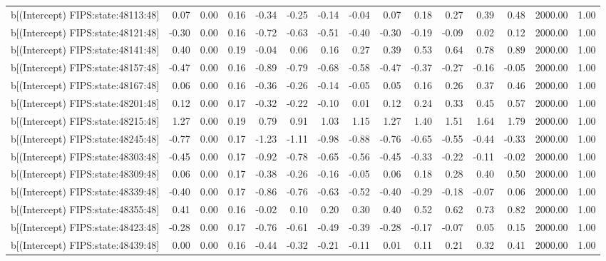 \begin{table}[ht]
\begin{tabular}{rrrrrrrrrrrrrrr}
  b[(Intercept) FIPS:state:48113:48] & 0.07 & 0.00 & 0.16 & -0.34 & -0.25 & -0.14 & -0.04 & 0.07 & 0.18 & 0.27 & 0.39 & 0.48 & 2000.00 & 1.00 \\ 
  b[(Intercept) FIPS:state:48121:48] & -0.30 & 0.00 & 0.16 & -0.72 & -0.63 & -0.51 & -0.40 & -0.30 & -0.19 & -0.09 & 0.02 & 0.12 & 2000.00 & 1.00 \\ 
  b[(Intercept) FIPS:state:48141:48] & 0.40 & 0.00 & 0.19 & -0.04 & 0.06 & 0.16 & 0.27 & 0.39 & 0.53 & 0.64 & 0.78 & 0.89 & 2000.00 & 1.00 \\ 
  b[(Intercept) FIPS:state:48157:48] & -0.47 & 0.00 & 0.16 & -0.89 & -0.79 & -0.68 & -0.58 & -0.47 & -0.37 & -0.27 & -0.16 & -0.05 & 2000.00 & 1.00 \\ 
  b[(Intercept) FIPS:state:48167:48] & 0.06 & 0.00 & 0.16 & -0.36 & -0.26 & -0.14 & -0.05 & 0.05 & 0.16 & 0.26 & 0.37 & 0.46 & 2000.00 & 1.00 \\ 
  b[(Intercept) FIPS:state:48201:48] & 0.12 & 0.00 & 0.17 & -0.32 & -0.22 & -0.10 & 0.01 & 0.12 & 0.24 & 0.33 & 0.45 & 0.57 & 2000.00 & 1.00 \\ 
  b[(Intercept) FIPS:state:48215:48] & 1.27 & 0.00 & 0.19 & 0.79 & 0.91 & 1.03 & 1.15 & 1.27 & 1.40 & 1.51 & 1.64 & 1.79 & 2000.00 & 1.00 \\ 
  b[(Intercept) FIPS:state:48245:48] & -0.77 & 0.00 & 0.17 & -1.23 & -1.11 & -0.98 & -0.88 & -0.76 & -0.65 & -0.55 & -0.44 & -0.33 & 2000.00 & 1.00 \\ 
  b[(Intercept) FIPS:state:48303:48] & -0.45 & 0.00 & 0.17 & -0.92 & -0.78 & -0.65 & -0.56 & -0.45 & -0.33 & -0.22 & -0.11 & -0.02 & 2000.00 & 1.00 \\ 
  b[(Intercept) FIPS:state:48309:48] & 0.06 & 0.00 & 0.17 & -0.38 & -0.26 & -0.16 & -0.05 & 0.06 & 0.18 & 0.28 & 0.40 & 0.50 & 2000.00 & 1.00 \\ 
  b[(Intercept) FIPS:state:48339:48] & -0.40 & 0.00 & 0.17 & -0.86 & -0.76 & -0.63 & -0.52 & -0.40 & -0.29 & -0.18 & -0.07 & 0.06 & 2000.00 & 1.00 \\ 
  b[(Intercept) FIPS:state:48355:48] & 0.41 & 0.00 & 0.16 & -0.02 & 0.10 & 0.20 & 0.30 & 0.40 & 0.52 & 0.62 & 0.73 & 0.82 & 2000.00 & 1.00 \\ 
  b[(Intercept) FIPS:state:48423:48] & -0.28 & 0.00 & 0.17 & -0.76 & -0.61 & -0.49 & -0.39 & -0.28 & -0.17 & -0.07 & 0.05 & 0.15 & 2000.00 & 1.00 \\ 
  b[(Intercept) FIPS:state:48439:48] & 0.00 & 0.00 & 0.16 & -0.44 & -0.32 & -0.21 & -0.11 & 0.01 & 0.11 & 0.21 & 0.32 & 0.41 & 2000.00 & 1.00 \\ 

\end{tabular}
\end{table}
